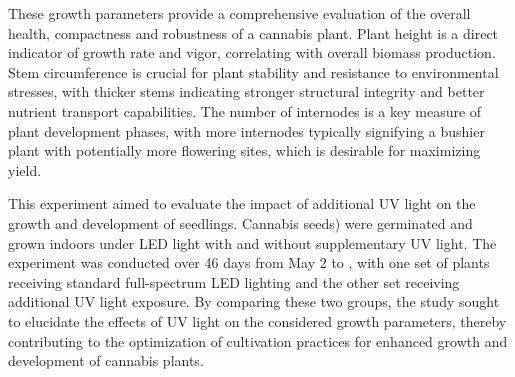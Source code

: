 These growth parameters provide a comprehensive evaluation of the overall health, compactness and robustness of a cannabis plant. Plant height is a direct indicator of growth rate and vigor, correlating with overall biomass production. Stem circumference is crucial for plant stability and resistance to environmental stresses, with thicker stems indicating stronger structural integrity and better nutrient transport capabilities. The number of internodes is a key measure of plant development phases, with more internodes typically signifying a bushier plant with potentially more flowering sites, which is desirable for maximizing yield.

This experiment aimed to evaluate the impact of additional UV light on the growth and development of  seedlings. Cannabis seeds) were germinated and grown indoors under LED light with and without supplementary UV light. The experiment was conducted over \num[mode=text]{46} days from May 2 to , with one set of plants receiving standard full-spectrum LED lighting and the other set receiving additional UV light exposure. By comparing these two groups, the study sought to elucidate the effects of UV light on the considered growth parameters, thereby contributing to the optimization of cultivation practices for enhanced growth and development of cannabis plants.